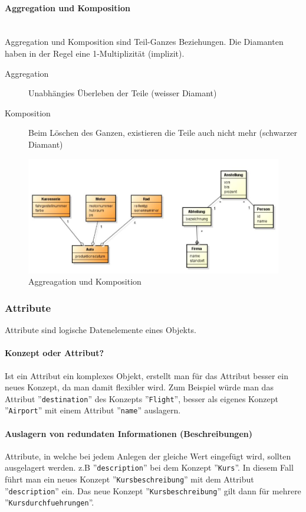 \paragraph{Aggregation und Komposition} \hfill \\
Aggregation und Komposition sind Teil-Ganzes Beziehungen. Die Diamanten haben in der Regel eine 1-Multiplizität (implizit).
\begin{description}
	\item[Aggregation] Unabhängies Überleben der Teile (weisser Diamant)
	\item[Komposition] Beim Löschen des Ganzen, existieren die Teile auch nicht mehr (schwarzer Diamant)
\end{description}

\begin{figure}[h]
	\centering
	\includegraphics[width=0.7\linewidth]{images/aggregation_komposition}
	\caption{Aggreagation und Komposition}
	\label{fig:aggregationkomposition}
\end{figure}

\subsubsection{Attribute}
Attribute sind logische Datenelemente eines Objekts.

\paragraph{Konzept oder Attribut?}
Ist ein Attribut ein komplexes Objekt, erstellt man für das Attribut besser ein neues Konzept, da man damit flexibler wird. Zum Beispiel würde man das Attribut ''\lstinline|destination|'' des Konzepts ''\lstinline|Flight|'', besser als eigenes Konzept ''\lstinline|Airport|'' mit einem Attribut ''\lstinline|name|'' auslagern.


\paragraph{Auslagern von redundaten Informationen (Beschreibungen)}
Attribute, in welche bei jedem Anlegen der gleiche Wert eingefügt wird, sollten ausgelagert werden. z.B ''\lstinline|description|'' bei dem Konzept ''\lstinline|Kurs|''. In diesem Fall führt man ein neues Konzept ''\lstinline|Kursbeschreibung|'' mit dem Attribut ''\lstinline|description|'' ein. Das neue Konzept ''\lstinline|Kursbeschreibung|'' gilt dann für mehrere ''\lstinline|Kursdurchfuehrungen|''.

